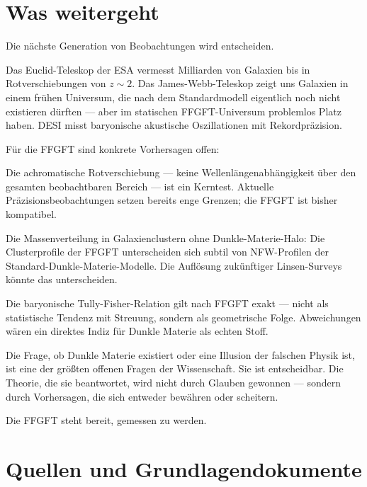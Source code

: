\documentclass[11pt,oneside]{book}
\begin{document}
\chapter{Was weitergeht}

Die nächste Generation von Beobachtungen wird entscheiden.

Das Euclid-Teleskop der ESA vermesst Milliarden von Galaxien
bis in Rotverschiebungen von $z \sim 2$. Das James-Webb-Teleskop
zeigt uns Galaxien in einem frühen Universum, die nach dem
Standardmodell eigentlich noch nicht existieren dürften —
aber im statischen FFGFT-Universum problemlos Platz haben.
DESI misst baryonische akustische Oszillationen mit
Rekordpräzision.

Für die FFGFT sind konkrete Vorhersagen offen:

Die achromatische Rotverschiebung — keine Wellenlängenabhängigkeit
über den gesamten beobachtbaren Bereich — ist ein Kerntest.
Aktuelle Präzisionsbeobachtungen setzen bereits enge Grenzen;
die FFGFT ist bisher kompatibel.

Die Massenverteilung in Galaxienclustern ohne Dunkle-Materie-Halo:
Die Clusterprofile der FFGFT unterscheiden sich subtil von
NFW-Profilen der Standard-Dunkle-Materie-Modelle. Die
Auflösung zukünftiger Linsen-Surveys könnte das unterscheiden.

Die baryonische Tully-Fisher-Relation gilt nach FFGFT exakt
— nicht als statistische Tendenz mit Streuung, sondern als
geometrische Folge. Abweichungen wären ein direktes Indiz
für Dunkle Materie als echten Stoff.

\medskip

Die Frage, ob Dunkle Materie existiert oder eine Illusion
der falschen Physik ist, ist eine der größten offenen Fragen
der Wissenschaft. Sie ist entscheidbar. Die Theorie, die sie
beantwortet, wird nicht durch Glauben gewonnen — sondern durch
Vorhersagen, die sich entweder bewähren oder scheitern.

Die FFGFT steht bereit, gemessen zu werden.

\backmatter

\chapter*{Quellen und Grundlagendokumente}
\end{document}
